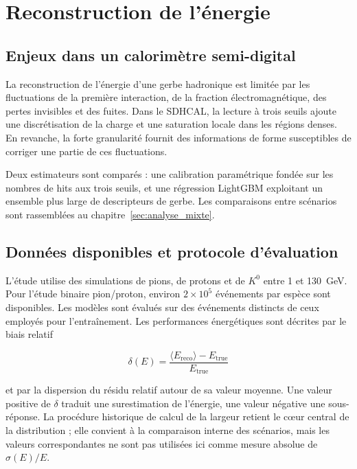 \chapter{Reconstruction de l'énergie}
\label{sec:energy_reco}

\section{Enjeux dans un calorimètre semi-digital}
\label{subsec:energy_challenges}

La reconstruction de l'énergie d'une gerbe hadronique est limitée par les fluctuations de la première interaction, de la fraction électromagnétique, des pertes invisibles et des fuites. Dans le SDHCAL, la lecture à trois seuils ajoute une discrétisation de la charge et une saturation locale dans les régions denses. En revanche, la forte granularité fournit des informations de forme susceptibles de corriger une partie de ces fluctuations.

Deux estimateurs sont comparés : une calibration paramétrique fondée sur les nombres de hits aux trois seuils, et une régression LightGBM exploitant un ensemble plus large de descripteurs de gerbe. Les comparaisons entre scénarios sont rassemblées au chapitre~\ref{sec:analyse_mixte}.

\section{Données disponibles et protocole d'évaluation}
\label{subsec:Data_protocol}

L'étude utilise des simulations de pions, de protons et de $K^0$ entre 1 et 130~GeV. Pour l'étude binaire pion/proton, environ $2\times10^5$ événements par espèce sont disponibles. Les modèles sont évalués sur des événements distincts de ceux employés pour l'entraînement. Les performances énergétiques sont décrites par le biais relatif

\begin{equation}
\delta(E)=\frac{\langle E_{\mathrm{reco}}\rangle-E_{\mathrm{true}}}{E_{\mathrm{true}}}
\end{equation}

et par la dispersion du résidu relatif autour de sa valeur moyenne. Une valeur positive de $\delta$ traduit une surestimation de l'énergie, une valeur négative une sous-réponse. La procédure historique de calcul de la largeur retient le c\oe ur central de la distribution ; elle convient à la comparaison interne des scénarios, mais les valeurs correspondantes ne sont pas utilisées ici comme mesure absolue de $\sigma(E)/E$.

